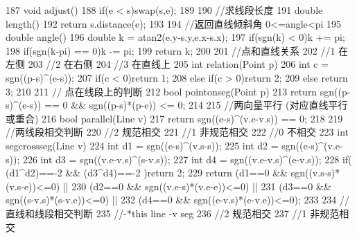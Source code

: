 \documentclass[11pt]{article}
\begin{document}
\begin{Code}
{187       void adjust(){
188           if(e < s)swap(s,e);
189       }
190       //求线段长度
191       double length(){
192           return s.distance(e);
193       }
194       //返回直线倾斜角 0<=angle<pi
195       double angle(){
196           double k = atan2(e.y-s.y,e.x-s.x);
197           if(sgn(k) < 0)k += pi;
198           if(sgn(k-pi) == 0)k -= pi;
199           return k;
200       }
201       //点和直线关系
202       //1 在左侧
203       //2 在右侧
204       //3 在直线上
205       int relation(Point p){
206           int c = sgn((p-s)^(e-s));
207           if(c < 0)return 1;
208           else if(c > 0)return 2;
209           else return 3;
210       }
211       // 点在线段上的判断
212       bool pointonseg(Point p){
213           return sgn((p-s)^(e-s)) == 0 && sgn((p-s)*(p-e)) <= 0;
214       }
215       //两向量平行 (对应直线平行或重合)
216       bool parallel(Line v){
217           return sgn((e-s)^(v.e-v.s)) == 0;
218       }
219       //两线段相交判断
220       //2 规范相交
221       //1 非规范相交
222       //0 不相交
223       int segcrossseg(Line v){
224           int d1 = sgn((e-s)^(v.s-s));
225           int d2 = sgn((e-s)^(v.e-s));
226           int d3 = sgn((v.e-v.s)^(s-v.s));
227           int d4 = sgn((v.e-v.s)^(e-v.s));
228           if( (d1^d2)==-2 && (d3^d4)==-2 )return 2;
229           return (d1==0 && sgn((v.s-s)*(v.s-e))<=0) ||
230               (d2==0 && sgn((v.e-s)*(v.e-e))<=0) ||
231               (d3==0 && sgn((s-v.s)*(s-v.e))<=0) ||
232               (d4==0 && sgn((e-v.s)*(e-v.e))<=0);
233       }
234       //直线和线段相交判断
235       //-*this line -v seg
236       //2 规范相交
237       //1 非规范相交


}
\end{Code}
\end{document}
